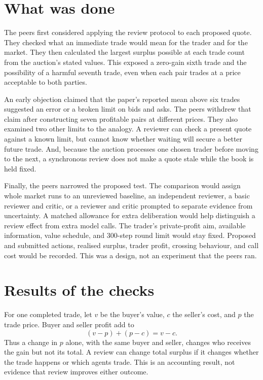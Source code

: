 \documentclass{article}
\begin{document}
\section{What was done}

The peers first considered applying the review protocol to each proposed quote. They checked what an immediate
trade would mean for the trader and for the market. They then calculated the largest surplus possible at each
trade count from the auction's stated values. This exposed a zero-gain sixth trade and the possibility of a
harmful seventh trade, even when each pair trades at a price acceptable to both parties.

An early objection claimed that the paper's reported mean above six trades suggested an error or a broken
limit on bids and asks. The peers withdrew that claim after constructing seven profitable pairs at different
prices. They also examined two other limits to the analogy. A reviewer can check a present quote against a
known limit, but cannot know whether waiting will secure a better future trade. And, because the auction
processes one chosen trader before moving to the next, a synchronous review does not make a quote stale while
the book is held fixed.

Finally, the peers narrowed the proposed test. The comparison would assign whole market runs to an unreviewed
baseline, an independent reviewer, a basic reviewer and critic, or a reviewer and critic prompted to separate
evidence from uncertainty. A matched allowance for extra deliberation would help distinguish a review effect
from extra model calls. The trader's private-profit aim, available information, value schedule, and 300-step
round limit would stay fixed. Proposed and submitted actions, realised surplus, trader profit, crossing
behaviour, and call cost would be recorded. This was a design, not an experiment that the peers ran.

\section{Results of the checks}

For one completed trade, let \(v\) be the buyer's value, \(c\) the seller's cost, and \(p\) the trade price.
Buyer and seller profit add to
\[
  (v-p)+(p-c)=v-c.
\]
Thus a change in \(p\) alone, with the same buyer and seller, changes who receives the gain but not its total.
A review can change total surplus if it changes whether the trade happens or which agents trade. This is an
accounting result, not evidence that review improves either outcome.
\end{document}
